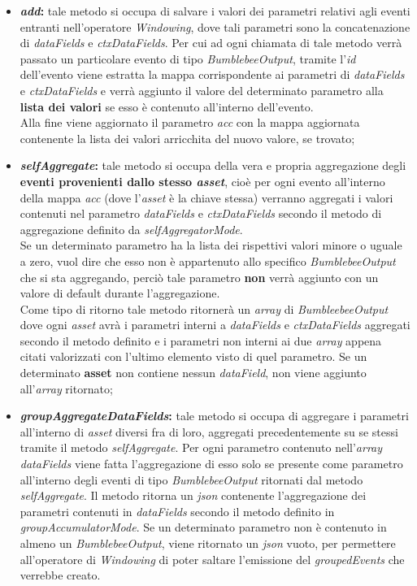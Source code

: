 \begin{itemize}
	\item{\textbf{\textit{add}:} tale metodo si occupa di salvare i valori dei parametri relativi agli eventi entranti nell'operatore \textit{Windowing}, dove tali parametri sono la concatenazione di \textit{dataFields} e \textit{ctxDataFields}. Per cui ad ogni chiamata di tale metodo verrà passato un particolare evento di tipo \textit{BumblebeeOutput}, tramite l'\textit{id} dell'evento viene estratta la mappa corrispondente ai parametri di \textit{dataFields} e \textit{ctxDataFields} e verrà aggiunto il valore del determinato parametro alla \textbf{lista dei valori} se esso è contenuto all'interno dell'evento.\\
Alla fine viene aggiornato il parametro \textit{acc} con la mappa aggiornata contenente la lista dei valori arricchita del nuovo valore, se trovato;}
	\item{\textbf{\textit{selfAggregate}:} tale metodo si occupa della vera e propria aggregazione degli \textbf{eventi provenienti dallo stesso \textit{asset}}, cioè per ogni evento all'interno della mappa \textit{acc} (dove l'\textit{asset} è la chiave stessa) verranno aggregati i valori contenuti nel parametro \textit{dataFields} e \textit{ctxDataFields} secondo il metodo di aggregazione definito da \textit{selfAggregatorMode}.\\
	Se un determinato parametro ha la lista dei rispettivi valori minore o uguale a zero, vuol dire che esso non è appartenuto allo specifico \textit{BumblebeeOutput} che si sta aggregando, perciò tale parametro \textbf{non} verrà aggiunto con un valore di default durante l'aggregazione.\\
	Come tipo di ritorno tale metodo ritornerà un \textit{array} di \textit{BumbleebeeOutput} dove ogni \textit{asset} avrà i parametri interni a \textit{dataFields} e \textit{ctxDataFields} aggregati secondo il metodo definito e i parametri non interni ai due \textit{array} appena citati valorizzati con l'ultimo elemento visto di quel parametro. Se un determinato \textbf{asset} non contiene nessun \textit{dataField}, non viene aggiunto all'\textit{array} ritornato;}
	\item{\textbf{\textit{groupAggregateDataFields}:} tale metodo si occupa di aggregare i parametri all'interno di \textit{asset} diversi fra di loro, aggregati precedentemente su se stessi tramite il metodo \textit{selfAggregate}. Per ogni parametro contenuto nell'\textit{array dataFields} viene fatta l'aggregazione di esso solo se presente come parametro all'interno degli eventi di tipo \textit{BumblebeeOutput} ritornati dal metodo \textit{selfAggregate}. Il metodo ritorna un \textit{\gls{json}} contenente l'aggregazione dei parametri contenuti in \textit{dataFields} secondo il metodo definito in \textit{groupAccumulatorMode}. Se un determinato parametro non è contenuto in almeno un \textit{BumblebeeOutput}, viene ritornato un \textit{\gls{json}} vuoto, per permettere all'operatore di \textit{Windowing} di poter saltare l'emissione del \textit{groupedEvents} che verrebbe creato.}
\end{itemize}
  


